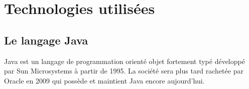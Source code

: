\section{Technologies utilisées}

%
%
%
%
%
%
%



\subsection{Le langage Java}

\par 
Java \cite{java_oracle} est un langage de programmation orienté objet fortement typé développé par Sun Microsystems à partir de 1995. La société sera plus tard rachetée par Oracle en 2009 qui possède et maintient Java encore aujourd'hui.

